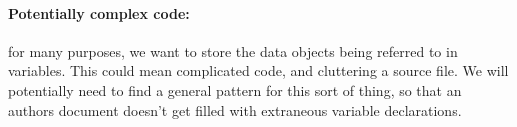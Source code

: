 \paragraph{Potentially complex code:} for many purposes, we want to store the data objects being referred to in variables. This 
could mean complicated code, and cluttering a source file. We will potentially need to find a general pattern for this sort of thing,
so that an authors document doesn't get filled with extraneous variable declarations. 